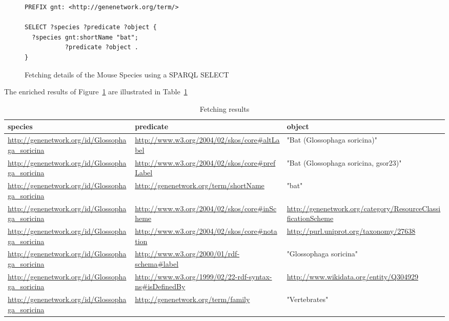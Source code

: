 \begin{figure}[H]
\centering
\begin{verbatim}
PREFIX gnt: <http://genenetwork.org/term/>

SELECT ?species ?predicate ?object {
  ?species gnt:shortName "bat";
           ?predicate ?object .
}
\end{verbatim}
\caption{Fetching details of the Mouse Species using a SPARQL SELECT}\label{sparql:mouse}
\end{figure}

The enriched results of Figure~\ref{sparql:mouse} are illustrated in Table~\ref{table:mouse-sparql-results}

\begin{table}[H]
\begin{tabular}{p{5cm}p{5cm}m{6cm}}
species & predicate & object\\[0pt]
\toprule
\url{http://genenetwork.org/id/Glossophaga\_soricina} & \url{http://www.w3.org/2004/02/skos/core\#altLabel} & "Bat (Glossophaga soricina)"\\[0pt]
\midrule
\url{http://genenetwork.org/id/Glossophaga\_soricina} & \url{http://www.w3.org/2004/02/skos/core\#prefLabel} & "Bat (Glossophaga soricina, gsor23)"\\[0pt]
\midrule
\url{http://genenetwork.org/id/Glossophaga\_soricina} & \url{http://genenetwork.org/term/shortName} & "bat"\\[0pt]
\midrule
\url{http://genenetwork.org/id/Glossophaga\_soricina} & \url{http://www.w3.org/2004/02/skos/core\#inScheme} & \url{http://genenetwork.org/category/ResourceClassificationScheme}\\[0pt]
\midrule
\url{http://genenetwork.org/id/Glossophaga\_soricina} & \url{http://www.w3.org/2004/02/skos/core\#notation} & \url{http://purl.uniprot.org/taxonomy/27638}\\[0pt]
\midrule
\url{http://genenetwork.org/id/Glossophaga\_soricina} & \url{http://www.w3.org/2000/01/rdf-schema\#label} & "Glossophaga soricina"\\[0pt]
\midrule
\url{http://genenetwork.org/id/Glossophaga\_soricina} & \url{http://www.w3.org/1999/02/22-rdf-syntax-ns\#isDefinedBy} & \url{http://www.wikidata.org/entity/Q304929}\\[0pt]
\midrule
\url{http://genenetwork.org/id/Glossophaga\_soricina} & \url{http://genenetwork.org/term/family} & "Vertebrates"\\[0pt]
\end{tabular}
\caption{Fetching results}\label{table:mouse-sparql-results}
\end{table}

